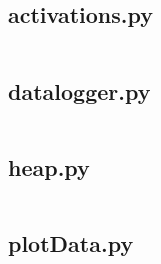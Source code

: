 \begin{flushleft}
    \subsection{activations.py}
    \inputminted[frame=leftline,framesep=2mm,baselinestretch=1.2,fontsize=\small,linenos]{python}{../Scripts/activations.py}

    \subsection{datalogger.py}
    \inputminted[frame=leftline,framesep=2mm,baselinestretch=1.2,fontsize=\small,linenos]{python}{../Scripts/datalogger.py}

    \subsection{heap.py}
    \inputminted[frame=leftline,framesep=2mm,baselinestretch=1.2,fontsize=\small,linenos]{python}{../Scripts/heap.py}

    \subsection{plotData.py}
    \inputminted[frame=leftline,framesep=2mm,baselinestretch=1.2,fontsize=\small,linenos]{python}{../Scripts/plotData.py}
\end{flushleft}
